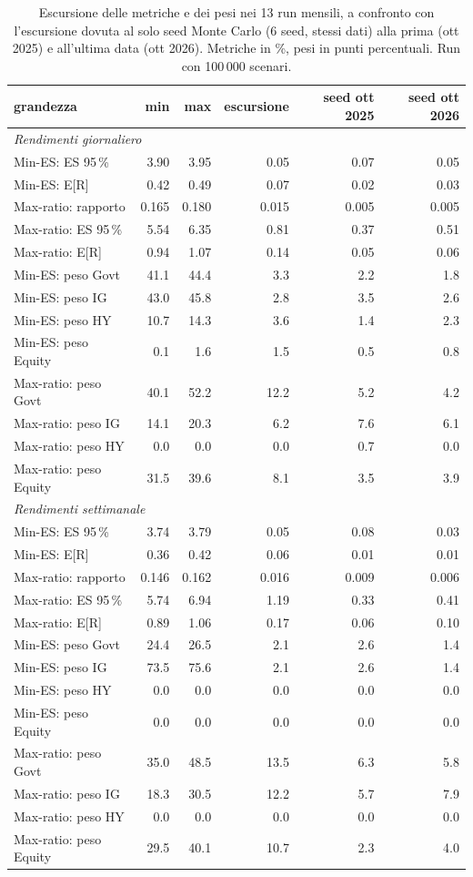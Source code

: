 \begin{table}[htbp]\centering\small\setlength{\tabcolsep}{3.5pt}
\caption{Escursione delle metriche e dei pesi nei 13 run mensili, a confronto con l'escursione dovuta al solo seed Monte Carlo (6 seed, stessi dati) alla prima (ott 2025) e all'ultima data (ott 2026). Metriche in \%, pesi in punti percentuali. Run con 100\,000 scenari.}\label{tab:summary}
\begin{tabular}{lrrrrr}\toprule
grandezza & min & max & escursione & seed ott 2025 & seed ott 2026 \\\midrule
\multicolumn{6}{l}{\emph{Rendimenti giornaliero}} \\
Min-ES: ES 95\,\% & 3.90 & 3.95 & 0.05 & 0.07 & 0.05 \\
Min-ES: E[R] & 0.42 & 0.49 & 0.07 & 0.02 & 0.03 \\
Max-ratio: rapporto & 0.165 & 0.180 & 0.015 & 0.005 & 0.005 \\
Max-ratio: ES 95\,\% & 5.54 & 6.35 & 0.81 & 0.37 & 0.51 \\
Max-ratio: E[R] & 0.94 & 1.07 & 0.14 & 0.05 & 0.06 \\
Min-ES: peso Govt & 41.1 & 44.4 & 3.3 & 2.2 & 1.8 \\
Min-ES: peso IG & 43.0 & 45.8 & 2.8 & 3.5 & 2.6 \\
Min-ES: peso HY & 10.7 & 14.3 & 3.6 & 1.4 & 2.3 \\
Min-ES: peso Equity & 0.1 & 1.6 & 1.5 & 0.5 & 0.8 \\
Max-ratio: peso Govt & 40.1 & 52.2 & 12.2 & 5.2 & 4.2 \\
Max-ratio: peso IG & 14.1 & 20.3 & 6.2 & 7.6 & 6.1 \\
Max-ratio: peso HY & 0.0 & 0.0 & 0.0 & 0.7 & 0.0 \\
Max-ratio: peso Equity & 31.5 & 39.6 & 8.1 & 3.5 & 3.9 \\
\multicolumn{6}{l}{\emph{Rendimenti settimanale}} \\
Min-ES: ES 95\,\% & 3.74 & 3.79 & 0.05 & 0.08 & 0.03 \\
Min-ES: E[R] & 0.36 & 0.42 & 0.06 & 0.01 & 0.01 \\
Max-ratio: rapporto & 0.146 & 0.162 & 0.016 & 0.009 & 0.006 \\
Max-ratio: ES 95\,\% & 5.74 & 6.94 & 1.19 & 0.33 & 0.41 \\
Max-ratio: E[R] & 0.89 & 1.06 & 0.17 & 0.06 & 0.10 \\
Min-ES: peso Govt & 24.4 & 26.5 & 2.1 & 2.6 & 1.4 \\
Min-ES: peso IG & 73.5 & 75.6 & 2.1 & 2.6 & 1.4 \\
Min-ES: peso HY & 0.0 & 0.0 & 0.0 & 0.0 & 0.0 \\
Min-ES: peso Equity & 0.0 & 0.0 & 0.0 & 0.0 & 0.0 \\
Max-ratio: peso Govt & 35.0 & 48.5 & 13.5 & 6.3 & 5.8 \\
Max-ratio: peso IG & 18.3 & 30.5 & 12.2 & 5.7 & 7.9 \\
Max-ratio: peso HY & 0.0 & 0.0 & 0.0 & 0.0 & 0.0 \\
Max-ratio: peso Equity & 29.5 & 40.1 & 10.7 & 2.3 & 4.0 \\
\bottomrule\end{tabular}\end{table}

